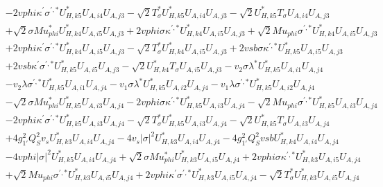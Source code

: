 \begin{align}
 &-2 vphi \kappa^\prime \sigma^{\prime,*} U^*_{{H},{k 5}} U_{A,{i 4}} U_{A,{j 3}} - \sqrt{2} T_{\sigma}^* U^*_{{H},{k 5}} U_{A,{i 4}} U_{A,{j 3}} - \sqrt{2} U^*_{{H},{k 5}} T_{\sigma} U_{A,{i 4}} U_{A,{j 3}} \nonumber \\ 
 &+\sqrt{2} \sigma Mu_{phi}^* U^*_{{H},{k 4}} U_{A,{i 5}} U_{A,{j 3}} +2 vphi \sigma \kappa^{\prime,*} U^*_{{H},{k 4}} U_{A,{i 5}} U_{A,{j 3}} +\sqrt{2} Mu_{phi} \sigma^{\prime,*} U^*_{{H},{k 4}} U_{A,{i 5}} U_{A,{j 3}} \nonumber \\ 
 &+2 vphi \kappa^\prime \sigma^{\prime,*} U^*_{{H},{k 4}} U_{A,{i 5}} U_{A,{j 3}} - \sqrt{2} T_{\sigma}^* U^*_{{H},{k 4}} U_{A,{i 5}} U_{A,{j 3}} +2 vsb \sigma \kappa^{\prime,*} U^*_{{H},{k 5}} U_{A,{i 5}} U_{A,{j 3}} \nonumber \\ 
 &+2 vsb \kappa^\prime \sigma^{\prime,*} U^*_{{H},{k 5}} U_{A,{i 5}} U_{A,{j 3}} - \sqrt{2} U^*_{{H},{k 4}} T_{\sigma} U_{A,{i 5}} U_{A,{j 3}} - v_2 \sigma \lambda^* U^*_{{H},{k 5}} U_{A,{i 1}} U_{A,{j 4}} \nonumber \\ 
 &- v_2 \lambda \sigma^{\prime,*} U^*_{{H},{k 5}} U_{A,{i 1}} U_{A,{j 4}} - v_1 \sigma \lambda^* U^*_{{H},{k 5}} U_{A,{i 2}} U_{A,{j 4}} - v_1 \lambda \sigma^{\prime,*} U^*_{{H},{k 5}} U_{A,{i 2}} U_{A,{j 4}} \nonumber \\ 
 &- \sqrt{2} \sigma Mu_{phi}^* U^*_{{H},{k 5}} U_{A,{i 3}} U_{A,{j 4}} -2 vphi \sigma \kappa^{\prime,*} U^*_{{H},{k 5}} U_{A,{i 3}} U_{A,{j 4}} - \sqrt{2} Mu_{phi} \sigma^{\prime,*} U^*_{{H},{k 5}} U_{A,{i 3}} U_{A,{j 4}} \nonumber \\ 
 &-2 vphi \kappa^\prime \sigma^{\prime,*} U^*_{{H},{k 5}} U_{A,{i 3}} U_{A,{j 4}} - \sqrt{2} T_{\sigma}^* U^*_{{H},{k 5}} U_{A,{i 3}} U_{A,{j 4}} - \sqrt{2} U^*_{{H},{k 5}} T_{\sigma} U_{A,{i 3}} U_{A,{j 4}} \nonumber \\ 
 &+4 g_{1'}^{2} Q_{S}^{2} v_s U^*_{{H},{k 3}} U_{A,{i 4}} U_{A,{j 4}} -4 v_s |\sigma|^2 U^*_{{H},{k 3}} U_{A,{i 4}} U_{A,{j 4}} -4 g_{1'}^{2} Q_{S}^{2} vsb U^*_{{H},{k 4}} U_{A,{i 4}} U_{A,{j 4}} \nonumber \\ 
 &-4 vphi |\sigma|^2 U^*_{{H},{k 5}} U_{A,{i 4}} U_{A,{j 4}} +\sqrt{2} \sigma Mu_{phi}^* U^*_{{H},{k 3}} U_{A,{i 5}} U_{A,{j 4}} +2 vphi \sigma \kappa^{\prime,*} U^*_{{H},{k 3}} U_{A,{i 5}} U_{A,{j 4}} \nonumber \\ 
 &+\sqrt{2} Mu_{phi} \sigma^{\prime,*} U^*_{{H},{k 3}} U_{A,{i 5}} U_{A,{j 4}} +2 vphi \kappa^\prime \sigma^{\prime,*} U^*_{{H},{k 3}} U_{A,{i 5}} U_{A,{j 4}} - \sqrt{2} T_{\sigma}^* U^*_{{H},{k 3}} U_{A,{i 5}} U_{A,{j 4}} \nonumber \\ 

\end{align}
